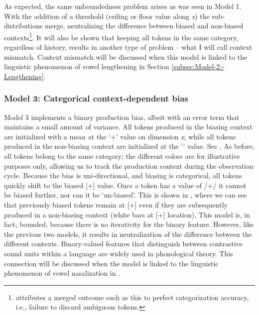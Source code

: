 As expected, the same unboundedness problem arises as was seen in
Model 1. With the addition of a threshold (ceiling or floor value
along \emph{x}) the sub-distributions merge, neutralizing the difference
between biased and non-biased contexts\footnote{\citet{DBLP:journals/corr/Tupper14a} attributes a merged outcome
such as this to perfect categorization accuracy, i.e., failure to
discard ambiguous tokens. }. It will also be shown that keeping all tokens in the same category,
regardless of history, results in another type of problem – what I
will call context mismatch. Context mismatch will be discussed when
this model is linked to the linguistic phenomenon of vowel lengthening
in Section \ref{subsec:Model-2:-Lengthening}. 

\subsubsection{\label{subsec:Model-3:-Categorical}Model 3: Categorical context-dependent bias}

Model 3 implements a binary production bias, albeit with an error
term that maintains a small amount of variance. All tokens produced
in the biasing context are initialized with a mean at the `+' value
on dimension \emph{x}, while all tokens produced in the non-biasing
context are initialized at the `\textminus' value. See .
As before, all tokens belong to the same category; the different colors
are for illustrative purposes only, allowing us to track the production
context during the observation cycle. Because the bias is uni-directional,
and biasing is categorical, all tokens quickly shift to the biased
{[}+{]} value. Once a token has a value of /+/ it cannot be biased
further, nor can it be `un-biased'. This is shown in ,
where we can see that previously biased tokens remain at {[}+{]} even
if they are subsequently produced in a non-biasing context (white
bars at {[}+{]} location). This model is, in fact, bounded, because
there is no iterativity for the binary feature. However, like the
previous two models, it results in neutralization of the difference
between the different contexts. Binary-valued features that distinguish
between contrastive sound units within a language are widely used
in phonological theory. This connection will be discussed when the
model is linked to the linguistic phenomenon of vowel nasalization
in .

